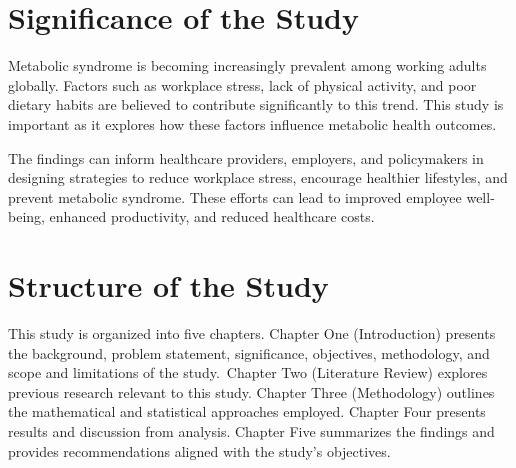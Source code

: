 \section{Significance of the Study}
Metabolic syndrome is becoming increasingly prevalent among working adults globally. Factors such as workplace stress, lack of physical activity, and poor dietary habits are believed to contribute significantly to this trend. This study is important as it explores how these factors influence metabolic health outcomes.

\par The findings can inform healthcare providers, employers, and policymakers in designing strategies to reduce workplace stress, encourage healthier lifestyles, and prevent metabolic syndrome. These efforts can lead to improved employee well-being, enhanced productivity, and reduced healthcare costs.


\section{Structure of the Study}
This study is organized into five chapters.
Chapter One (Introduction) presents the background, problem statement, significance, objectives, methodology, and scope and limitations of the study.\
Chapter Two (Literature Review) explores previous research relevant to this study. Chapter Three (Methodology) outlines the mathematical and statistical approaches employed. Chapter Four presents results and discussion from analysis.
Chapter Five summarizes the findings and provides recommendations aligned with the study's objectives.

